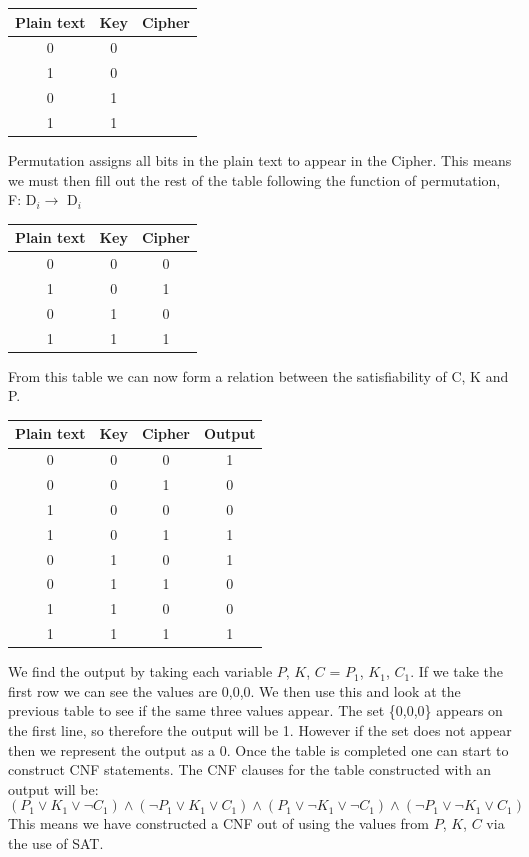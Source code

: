 \documentclass[11pt,a4paper, notitlepage]{report}
\begin{document}
\begin{center}
\begin{tabular}{|c|c|c|}
\hline
Plain text & Key & Cipher\\ \hline
0 & 0 & {}\\ \hline
1 & 0 & {}\\ \hline
0 & 1 & {}\\ \hline
1 & 1 & {}\\ \hline
\end{tabular}
\end{center}
Permutation assigns all bits in the plain text to appear in the Cipher. This means we must then fill out the rest of the table following the function of permutation, F: D$_{i} \rightarrow$ D$_{i}$

\begin{center}
\begin{tabular}{|c|c|c|}
\hline
Plain text & Key & Cipher\\ \hline
0 & 0 & 0\\ \hline
1 & 0 & 1\\ \hline
0 & 1 & 0\\ \hline
1 & 1 & 1\\ \hline
\end{tabular}
\end{center}
From this table we can now form a relation between the satisfiability of C, K and P.

\begin{center}
\begin{tabular}{|c|c|c|c|}
\hline
Plain text & Key & Cipher & Output\\ \hline
0 & 0 & 0 & 1\\ \hline
0 & 0 & 1 & 0\\ \hline
1 & 0 & 0 & 0\\ \hline
1 & 0 & 1 & 1\\ \hline
0 & 1 & 0 & 1\\ \hline
0 & 1 & 1 & 0\\ \hline
1 & 1 & 0 & 0\\ \hline
1 & 1 & 1 & 1\\ \hline
\end{tabular}
\end{center}
We find the output by taking each variable {$P$, $K$, $C$} = {$P_{1}$, $K_{1}$, $C_{1}$}. If we take the first row we can see the values are 0,0,0. We then use this and look at the previous table to see if the same three values appear. The set \{0,0,0\} appears on the first line, so therefore the output will be 1. However if the set does not appear then we represent the output as a 0. Once the table is completed one can start to construct CNF statements.
The CNF clauses for the table constructed with an output will be:
\begin{displaymath}
(P_{1} \lor K_{1} \lor \neg C_{1}) \land (\neg P_{1} \lor K_{1} \lor C_{1}) \land (P_{1} \lor \neg K_{1} \lor \neg C_{1}) \land (\neg P_{1} \lor \neg K_{1} \lor C_{1})
\end{displaymath}
This means we have constructed a CNF out of using the values from $P$, $K$, $C$ via the use of SAT.
\end{document}
